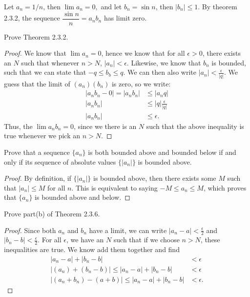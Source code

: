 \documentclass[12pt]{book}
\newenvironment{exercise}[2][Exercise]{\begin{trivlist}
\item[\hskip \labelsep {\bfseries #1}\hskip \labelsep {\bfseries #2.}]}{\end{trivlist}}
\begin{document}
\begin{exercise}{1.4.6}
\begin{exercise}{2.3.3}
\end{exercise}

\begin{exercise}{2.3.4}
Let $a_n = 1/n$, then $\lim a_n = 0,$ and let $b_n = \sin n$, then $|b_n| \leq 1$. By theorem 2.3.2, the sequence $\dfrac{\sin n}{n} = a_n b_n$ has limit zero. 
\end{exercise}


\begin{exercise}{2.3.5}
Prove Theorem 2.3.2.

	\begin{proof}
	We know that $\lim a_n = 0$, hence we know that for all $\epsilon > 0$, there exists an $N$ such that whenever $n>N$, $|a_n | < \epsilon$. Likewise, we know that $b_n$ is bounded, such that we can state that $- q \leq b_b \leq q$. We can then also write $|a_n| < \frac{\epsilon}{|q|}$.  We guess that the limit of $ (a_n)(b_n)$ is zero, so we write:
		\begin{align*}
		|a_n b_n - 0| = |a_n b_n| &\leq | a_n q| \\
		|a_n b_n| &\leq |q| \frac{\epsilon}{|q|}  \\
		|a_n b_n| &\leq \epsilon.
		\end{align*}
	Thus, the $\lim a_n b_n = 0$, since we there is an $N$ such that the above inequality is true whenever we pick an $n>N$.
	\end{proof}
\end{exercise}


\begin{exercise}{2.3.6}
Prove that a sequence $\{a_n\}$ is both bounded above and bounded below if and only if its sequence of absolute values $\{|a_n|\}$ is bounded above. 

\begin{proof}
By definition, if $\{|a_n|\}$ is bounded above, then there exists some $M$ such that $|a_n| \leq M$ for all $n$. This is equivalent to saying $-M \leq a_n \leq M$, which proves that $\{a_n\}$ is bounded above and below.
\end{proof}
\end{exercise}


\begin{exercise}{2.3.7}
Prove part(b) of Theorem 2.3.6. 

\begin{proof}
	Since both $a_n$ and $b_n$ have a limit, we can write $|a_n -a| < \frac{\epsilon}{2}$ and $|b_n - b| < \frac{\epsilon}{2}$. For all $\epsilon$, we have an $N$ such that if we choose $n>N$, these inequalities are true. We know add them together and find
	\begin{align*}
	|a_n - a| + |b_n - b| &< \epsilon \\
	|(a_n) + (b_n -b) | \leq |a_n - a| + |b_n - b| &< \epsilon \\
	|(a_n + b_n) - (a+b) | \leq |a_n - a| + |b_n - b| &< \epsilon.
	\end{align*} 
\end{proof}
\end{exercise}



\end{exercise}
\end{document}
